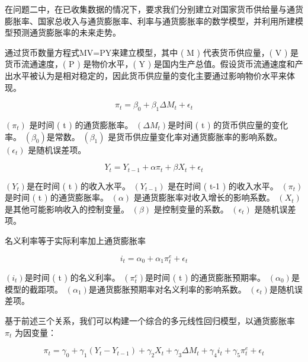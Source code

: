 
在问题二中，在已收集数据的情况下，要求我们分别建立对国家货币供给量与通货膨胀率、国家总收入与通货膨胀率、利率与通货膨胀率的数学模型，并利用所建模型预测通货膨胀率的未来走势。


通过货币数量方程式MV=PY来建立模型，其中 ( M ) 代表货币供应量，( V ) 是货币流通速度，( P ) 是物价水平，( Y ) 是国内生产总值。假设货币流通速度和产出水平被认为是相对稳定的，因此货币供应量的变化主要通过影响物价水平来体现。

\begin{equation}
	\pi_t = \beta_0 + \beta_1 \Delta M_t + \epsilon_t
\end{equation}

$( \pi_t )$ 是时间 ( t ) 的通货膨胀率。
$( \Delta M_t )$是时间 ( t ) 的货币供应量的变化率。
$( \beta_0 )$是常数。
$( \beta_1 )$ 是货币供应量变化率对通货膨胀率的影响系数。
$( \epsilon_t )$ 是随机误差项。

\begin{equation}
	Y_t = Y_{t-1} + \alpha \pi_t + \beta X_t + \epsilon_t 
\end{equation}

$( Y_t )$是在时间 ( t ) 的收入水平。
$( Y_{t-1} )$ 是在时间 ( t-1 ) 的收入水平。
$( \pi_t )$ 是时间 ( t ) 的通货膨胀率。
$( \alpha )$ 是通货膨胀率对收入增长的影响系数。
$( X_t )$ 是其他可能影响收入的控制变量。
$( \beta )$ 是控制变量的系数。
$( \epsilon_t )$ 是随机误差项。


名义利率等于实际利率加上通货膨胀率

\begin{equation}
	i_t = \alpha_0 + \alpha_1 \pi_t^e + \epsilon_t
\end{equation}

$(i_t )$是时间 ( t ) 的名义利率。
$( \pi_t^e )$是时间 ( t ) 的通货膨胀预期率。
$( \alpha_0 )$是模型的截距项。
$( \alpha_1 )$是通货膨胀预期率对名义利率的影响系数。
$( \epsilon_t )$是随机误差项。


基于前述三个关系，我们可以构建一个综合的多元线性回归模型，以通货膨胀率 $\pi_t$ 为因变量：

\begin{equation}
\pi_t = \gamma_0 + \gamma_1 (Y_t - Y_{t-1}) + \gamma_2 X_t + \gamma_3 \Delta M_t + \gamma_4 i_t + \gamma_5 \pi_t^e + \epsilon_t
\end{equation}


